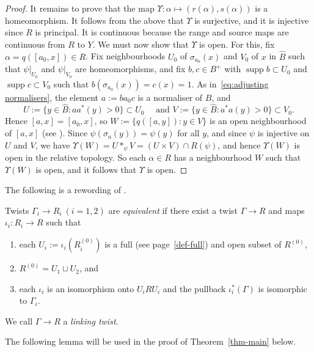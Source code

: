 \documentclass[12pt,a4paper]{amsart}
\newcommand{\supp}{\operatorname{supp}}
\begin{document}
\begin{proof}
It remains to prove that the map $\Upsilon : \alpha \mapsto
(r(\alpha), s(\alpha))$ is a homeomorphism. It follows from the
above that $\Upsilon$ is surjective, and it is injective since
$R$ is principal. It is continuous because the range and source
maps are continuous from $R$ to $Y$. We must now show that
$\Upsilon$ is open. For this, fix $\alpha = q([a_0,x]) \in R$.
Fix neighbourhoods $U_0$ of $\sigma_{a_0}(x)$ and $V_0$ of $x$
in $\widehat{B}$ such that $\psi|_{U_0}$ and $\psi|_{V_0}$ are
homeomorphisms, and fix $b, c \in B^+$ with $\supp b \subset
U_0$ and $\supp c \subset V_0$ such that $b(\sigma_{a_0}(x)) =
c(x) = 1$. As in~\eqref{eq:adjusting normalisers}, the element
$a := b a_0 c$ is a normaliser of $B$, and
\[
U := \{y \in \widehat{B} : aa^*(y) > 0\} \subset U_0\quad\text{ and }
V := \{y \in \widehat{B} : a^*a(y) > 0\} \subset V_0.
\]
Hence $[a,x] = [a_0,x]$, so $W := \{q([a,y]) : y \in V\}$ is an
open neighbourhood of $[a,x]$ (see
\cite[page~982]{Kumjian1986}). Since $\psi(\sigma_a(y)) =
\psi(y)$ for all $y$, and since $\psi$ is injective on $U$ and
$V$, we have $\Upsilon(W) = U *_\psi V = (U \times V) \cap
R(\psi)$, and hence $\Upsilon(W)$ is open in the relative topology. So each
$\alpha \in R$ has a neighbourhood $W$ such that $\Upsilon(W)$
is open, and it follows that $\Upsilon$ is open.
\end{proof}

The following is a rewording of
\cite[Definition~5.5]{Kumjian1986}.
\begin{defn}\label{dfn:twists equivalent}
Twists $\Gamma_i \to R_i\ (i=1,2)$ are \emph{equivalent} if
there exist a twist $\Gamma \to R$ and maps $\iota_i : R_i \to
R$ such that
\begin{enumerate}
\item each $U_i := \iota_i(R^{(0)}_i)$ is a full (see page~\ref{def-full}) and open
    subset of $R^{(0)}$,
\item $R^{(0)} = U_1 \sqcup U_2$, and
\item each $\iota_i$ is an isomorphism onto $U_i R U_i$ and
    the pullback $\iota_i^*(\Gamma)$ is isomorphic to
    $\Gamma_i$.
\end{enumerate}
We call  $\Gamma\to R$ a \emph{linking twist}.
\end{defn}

The following lemma will be used in the proof of
Theorem~\ref{thm-main}  below.
\end{document}
